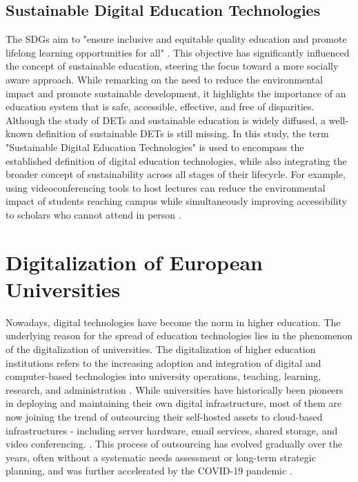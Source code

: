 \subsection{Sustainable Digital Education Technologies}
The SDGs aim to "ensure inclusive and equitable quality education and promote lifelong learning opportunities for all" \cite{united_nations_goal_2015}. This objective has significantly influenced the concept of sustainable education, steering the focus toward a more socially aware approach. While remarking on the need to reduce the environmental impact and promote sustainable development, it highlights the importance of an education system that is safe, accessible, effective, and free of disparities. Although the study of DETs and sustainable education is widely diffused, a well-known definition of sustainable DETs is still missing.
In this study, the term "Sustainable Digital Education Technologies" is used to encompass the established definition of digital education technologies, while also integrating the broader concept of sustainability across all stages of their lifecycle. For example, using videoconferencing tools to host lectures can reduce the environmental impact of students reaching campus while simultaneously improving accessibility to scholars who cannot attend in person \cite{grebennikova_sustainable_2021}.


\section{Digitalization of European Universities}
\label{sec:2.2_digitalization}
Nowadays, digital technologies have become the norm in higher education. The underlying reason for the spread of education technologies lies in the phenomenon of the digitalization of universities. The digitalization of higher education institutions refers to the increasing adoption and integration of digital and computer-based technologies into university operations, teaching, learning, research, and administration \cite{schuetze_digitalization_2024}. While universities have historically been pioneers in deploying and maintaining their own digital infrastructure, most of them are now joining the trend of outsourcing their self-hosted assets to cloud-based infrastructures - including server hardware, email services, shared storage, and video conferencing. \cite{angeli_conceptualising_2022}. This process of outsourcing has evolved gradually over the years, often without a systematic needs assessment or long-term strategic planning, and was further accelerated by the COVID-19 pandemic \cite{schuetze_digitalization_2024}.

